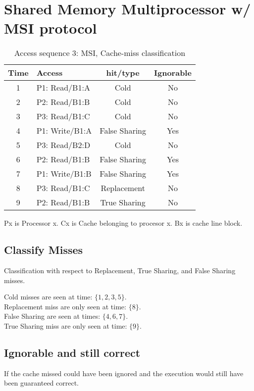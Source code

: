 \documentclass[a4paper,10pt]{article}
\begin{document}
\newpage


\section{Shared Memory Multiprocessor w/ MSI protocol}
\begin{table}[h!]
  \centering
  \begin{tabular}{|c|l|c|c|}
    \hline
    Time & Access       & hit/type & Ignorable \\ \hline
     1 & P1: Read/B1:A  & Cold     & No \\
     2 & P2: Read/B1:B  & Cold     & No \\
     3 & P3: Read/B1:C  & Cold     & No \\
     4 & P1: Write/B1:A & False Sharing & Yes \\
     5 & P3: Read/B2:D  & Cold     & No \\
     6 & P2: Read/B1:B  & False Sharing & Yes \\
     7 & P1: Write/B1:B & False Sharing & Yes \\
     8 & P3: Read/B1:C  & Replacement & No \\
     9 & P2: Read/B1:B  & True Sharing & No \\ \hline
  \end{tabular}
  \caption{Access sequence 3: MSI, Cache-miss classification}
  \label{tab:mesi_2_migration}
  Px is Processor x. Cx is Cache belonging to procesor x. Bx is cache line block.
\end{table}

\subsection{Classify Misses}
Classification with respect to Replacement, True Sharing, and False Sharing misses.

Cold misses are seen at time: $\lbrace 1,2,3,5 \rbrace$. \\
Replacement miss are only seen at time: $\lbrace 8 \rbrace$. \\
False Sharing are seen at times: $\lbrace 4,6,7 \rbrace$. \\
True Sharing miss are only seen at time: $\lbrace 9 \rbrace$.

\subsection{Ignorable and still correct}
If the cache missed could have been ignored and the execution would still have been guaranteed correct.
\end{document}
